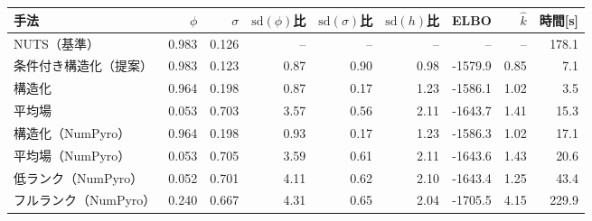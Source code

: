 \begin{tabular}{lrrrrrrrr}
\toprule
手法 & $\phi$ & $\sigma$ & $\mathrm{sd}(\phi)$比 & $\mathrm{sd}(\sigma)$比 & $\mathrm{sd}(h)$比 & ELBO & $\hat k$ & 時間[s] \\
\midrule
NUTS（基準） & 0.983 & 0.126 & -- & -- & -- & -- & -- & 178.1 \\
条件付き構造化（提案） & 0.983 & 0.123 & 0.87 & 0.90 & 0.98 & -1579.9 & 0.85 & 7.1 \\
構造化 & 0.964 & 0.198 & 0.87 & 0.17 & 1.23 & -1586.1 & 1.02 & 3.5 \\
平均場 & 0.053 & 0.703 & 3.57 & 0.56 & 2.11 & -1643.7 & 1.41 & 15.3 \\
構造化（NumPyro） & 0.964 & 0.198 & 0.93 & 0.17 & 1.23 & -1586.3 & 1.02 & 17.1 \\
平均場（NumPyro） & 0.053 & 0.705 & 3.59 & 0.61 & 2.11 & -1643.6 & 1.43 & 20.6 \\
低ランク（NumPyro） & 0.052 & 0.701 & 4.11 & 0.62 & 2.10 & -1643.4 & 1.25 & 43.4 \\
フルランク（NumPyro） & 0.240 & 0.667 & 4.31 & 0.65 & 2.04 & -1705.5 & 4.15 & 229.9 \\
\bottomrule
\end{tabular}
